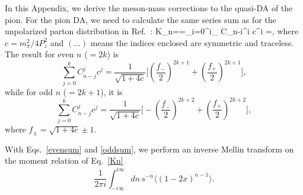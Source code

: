 



In this Appendix, we derive the meson-mass corrections to the quasi-DA of the pion. 
For the pion DA, we need to calculate the same series sum as for the unpolarized parton distribution in Ref.~\cite{Chen:2016utp}:
\beq\label{Kn}
 K_n==\sum_{i=0}^{i_} C_{n-i}^i c^i =,
\eeq
where $c=m_{\pi}^2/4 P_z^2$ and $(\ldots)$ means the indices enclosed are symmetric and traceless. The result for even $n$ ($=2k$) is
%
\begin{equation}\label{evensum}
\sum_{j=0}^k  C_{n-j}^j c^j =\frac{1}{\sqrt{1+4c}}\Big[\left(\frac{f_-}{2}\right)^{2k+1}+\left(\frac{f_+}{2}\right)^{2k+1}\Big],
\end{equation}
%
while for odd $n$ ($=2k+1$), it is
%
\begin{equation}\label{oddsum}
\sum_{j=0}^k C_{n-j}^j c^j =\frac{1}{\sqrt{1+4c}}\Big[-\left(\frac{f_-}{2}\right)^{2k+2}+\left(\frac{f_+}{2}\right)^{2k+2}\Big],
\end{equation}
%
where $f_{\pm}=\sqrt{1+4c}\pm 1$. 

With Eqs.~\ref{evensum} and \ref{oddsum}, we perform an inverse Mellin transform on the moment relation of Eq.~\ref{Kn}
%
\begin{equation}
\frac{1}{2\pi i}\int_{-i\infty}^{i\infty} dn \, s^{-n} \langle (1-2x)^{n-1} \rangle .
\end{equation}


